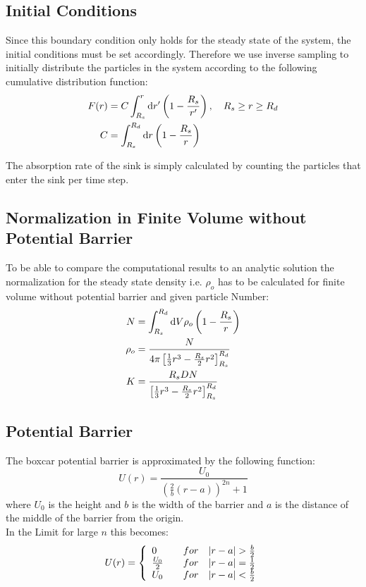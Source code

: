\subsection{Initial Conditions}
Since this boundary condition only holds for the steady state of the system, the initial conditions must be set accordingly. Therefore we use inverse sampling to initially distribute the particles in the system according to the following cumulative distribution function:
\begin{align}
    F(r) &= C \int_{R_s}^{r} {\rm d} r' \left( 1 - \frac{R_s}{r'} \right), \quad R_s \ge r \ge R_d \\
    C    &= \int_{R_s}^{R_d} {\rm d} r \left( 1 - \frac{R_s}{r} \right)
    \label{CDF}
\end{align}

The absorption rate of the sink is simply calculated by counting the particles that enter the sink per time step. \\
\subsection{Normalization in Finite Volume without Potential Barrier}
To be able to compare the computational results to an analytic solution the normalization for the steady state density i.e. $\rho_o$ has to be calculated for finite volume without potential barrier and given particle Number:
\begin{align}
    N &= \int_{R_s}^{R_d} {\rm d} V \rho_o \left( 1 - \frac{R_s}{r} \right) \\
    \rho_o &= \frac{N}{4 \pi \left[ \frac{1}{3}r^{3} - \frac{R_s}{2}r^{2} \right]_{R_s}^{R_d}} \\
    K &= \frac{R_s D N}{  \left[ \frac{1}{3}r^{3} - \frac{R_s}{2}r^{2} \right]_{R_s}^{R_d}}
    \label{normalization}
\end{align}
\subsection{Potential Barrier}
The boxcar potential barrier is approximated by the following function:
\begin{equation}
    U(r) = \frac{U_0}{\left( \frac{2}{b}\left( r - a \right) \right)^{2 n} + 1}
    \label{Boxcar_potential}
\end{equation}
where $U_0$ is the height and $b$ is the width of the barrier and $a$ is the distance of the middle of the barrier from the origin. \\
In the Limit for large $n$ this becomes:
\begin{equation}
    U(r) = \left\{ \begin{array}{l l}
        0 & \quad for \quad |r-a| > \frac{b}{2} \\
        \frac{U_0}{2} & \quad for \quad |r-a| = \frac{1}{2} \\
        U_0 & \quad for \quad |r-a| < \frac{b}{2}
    \end{array} \right.
    \label{lim_Boxcar_Potential}
\end{equation}
